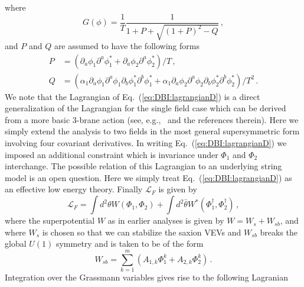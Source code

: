 \documentclass[12pt]{article}
\begin{document}
where
\begin{equation}
  G\left(\phi\right) = \frac{1}{T} \frac{1}{1 + P + \sqrt{\left(1 + P\right)^2 - Q}}\,,
\end{equation}
and $P$ and $Q$ are assumed to have the following forms
\begin{equation} \label{eq:DBI:PQ}
  \begin{aligned}
    P &= \left(
        \partial_a \phi_1 \partial^a \phi^*_1
      + \partial_a \phi_2 \partial^a \phi^*_2
    \right) / T\,,\\
    Q &= \left(
        \alpha_1 \partial_a \phi_1 \partial^a \phi_1 \partial_b \phi^*_1 \partial^b \phi^*_1
      + \alpha_1 \partial_a \phi_2 \partial^a \phi_2 \partial_b \phi^*_2 \partial^b \phi^*_2
    \right) / T^2\,.
  \end{aligned}
\end{equation}
We note that the Lagrangian of Eq.~(\ref{eq:DBI:lagrangianD}) is a direct generalization of the Lagrangian for the single field case which can be derived from a more basic 3-brane action (see, e.g.,~\cite{Rocek:1997hi, Tseytlin:1999dj, Sasaki:2012ka} and the references therein).
Here we simply extend the analysis to two fields in the most general supersymmetric form involving four covariant derivatives.
In writing Eq.~(\ref{eq:DBI:lagrangianD}) we imposed an additional constraint which is invariance under $\Phi_1$ and $\Phi_2$ interchange.
The possible relation of this Lagrangian to an underlying string model is an open question.
Here we simply treat Eq.~(\ref{eq:DBI:lagrangianD}) as an effective low energy theory.
Finally $\mathcal{L}_F$ is given by
\begin{equation}
  \mathcal{L}_F = \int d^2 \theta W\left(\Phi_1, \Phi_2\right)
                + \int d^2 \bar\theta W^*\left(\Phi_1^\dagger, \Phi_2^\dagger\right)\,,
\end{equation}
where the superpotential $W$ as in earlier analyses is given by $W = W_s + W_{sb}$, and where $W_s$ is chosen so that we can stabilize the saxion VEVs and $W_{sb}$ breaks the global $U\left(1\right)$ symmetry and is taken to be of the form
\begin{equation} \label{eq:dbi:Wsb}
  W_{sb} = \sum_{k = 1}^m \left(A_{1, k} \Phi_1^k + A_{2, k} \Phi_2^k\right)\,.
\end{equation}
Integration over the Grassmann variables gives rise to the following Lagranian
\end{document}
